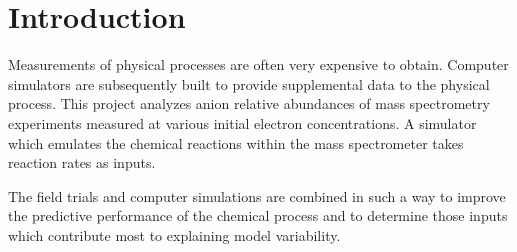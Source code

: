 \section{Introduction}

Measurements of physical processes are often very expensive to obtain. Computer simulators are subsequently built to provide supplemental data to the physical process. This project analyzes anion relative abundances of mass spectrometry experiments measured at various initial electron concentrations. A simulator which emulates the chemical reactions within the mass spectrometer takes reaction rates as inputs.

The field trials and computer simulations are combined in such a way to improve the predictive performance of the chemical process and to determine those inputs which contribute most to explaining model variability.
